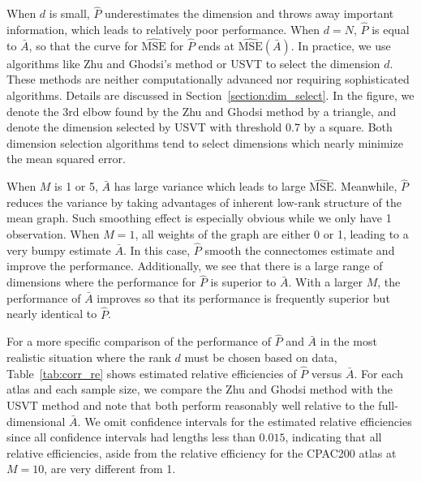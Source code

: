 \documentclass[10pt,letterpaper]{article}
\renewcommand{\hat}{\widehat}
\begin{document}
When $d$ is small, $\hat{P}$ underestimates the dimension and throws away important information, which leads to relatively poor performance. When $d=N$, $\hat{P}$ is equal to $\bar{A}$, so that the curve for $\hat{\mathrm{MSE}}$ for $\hat{P}$ ends at $\hat{\mathrm{MSE}}(\bar{A})$. 
In practice, we use algorithms like Zhu and Ghodsi's method or USVT to select the dimension $d$. These methods are neither computationally advanced nor requiring sophisticated algorithms. Details are discussed in Section~\ref{section:dim_select}. 
In the figure, we denote the 3rd elbow found by the Zhu and Ghodsi method by a triangle, and denote the dimension selected by USVT with threshold 0.7 by a square. 
Both dimension selection algorithms tend to select dimensions which nearly minimize the mean squared error.

When $M$ is 1 or 5, $\bar{A}$ has large variance which leads to large $\hat{\mathrm{MSE}}$. Meanwhile, $\hat{P}$ reduces the variance by taking advantages of inherent low-rank structure of the mean graph. Such smoothing effect is especially obvious while we only have 1 observation. When $M = 1$, all weights of the graph are either 0 or 1, leading to a very bumpy estimate $\bar{A}$. In this case, $\hat{P}$ smooth the connectomes estimate and improve the performance.
Additionally, we see that there is a large range of dimensions where the performance for $\hat{P}$ is superior to $\bar{A}$. 
With a larger $M$, the performance of $\bar{A}$ improves so that its performance is frequently superior but nearly identical to $\hat{P}$.

For a more specific comparison of the performance of $\hat{P}$ and $\bar{A}$ in the most realistic situation where the rank $d$ must be chosen based on data, Table~\ref{tab:corr_re} shows estimated relative efficiencies of $\hat{P}$ versus $\bar{A}$.
For each atlas and each sample size, we compare the Zhu and Ghodsi method \citep{zhu2006automatic} with the USVT method \citep{chatterjee2015matrix} and note that both perform reasonably well relative to the full-dimensional $\bar{A}$.
We omit confidence intervals for the estimated relative efficiencies since all confidence intervals had lengths less than $0.015$, indicating that all relative efficiencies, aside from the relative efficiency for the CPAC200 atlas at $M=10$, are very different from 1.
\end{document}
